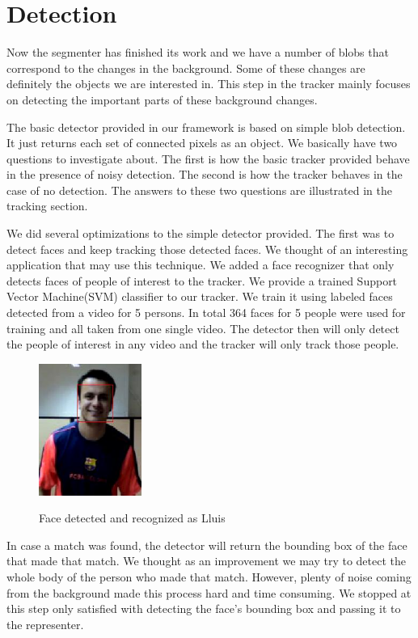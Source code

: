 \section{Detection}

Now the segmenter has finished its work and we have a number of blobs that correspond to the changes in the background. Some of these changes are definitely the objects we are interested in. This step in the tracker mainly focuses on detecting the important parts of these background changes.

The basic detector provided in our framework is based on simple blob detection. It just returns each set of connected pixels as an object. We basically have two questions to investigate about. The first is how the basic tracker provided behave in the presence of noisy detection. The second is how the tracker behaves in the case of no detection. The answers to these two questions are illustrated in the tracking section.

We did several optimizations to the simple detector provided. The first was to detect faces and keep tracking those detected faces. We thought of an interesting application that may use this technique. We added a face recognizer that only detects faces of people of interest to the tracker. We provide a trained Support Vector Machine(SVM) classifier to our tracker. We train it using labeled faces detected from a video for 5 persons. In total 364 faces for 5 people were used for training and all taken from one single video. The detector then will only detect the people of interest in any video and the tracker will only track those people.

\begin{figure}[Face detection and recognition]{\includegraphics[width=0.3\textwidth]{det_lluis}}
  \centering
  \caption{Face detected and recognized as Lluis}
\end{figure}

In case a match was found, the detector will return the bounding box of the face that made that match. We thought as an improvement we may try to detect the whole body of the person who made that match. However, plenty of noise coming from the background made this process hard and time consuming. We stopped at this step only satisfied with detecting the face's bounding box and passing it to the representer.